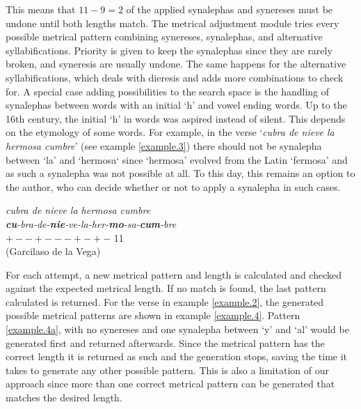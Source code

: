 \documentclass[a4paper,11pt,twocolumn,twoside]{article}
\begin{document}
This means that $11 - 9 = 2$ of the applied synalephas and synereses must be undone until both lengths match. The metrical adjustment module tries every possible metrical pattern combining synereses, synalephas, and alternative syllabifications. Priority is given to keep the synalephas since they are rarely broken, and syneresis are usually undone. The same happens for the alternative syllabifications, which deals with dieresis and adds more combinations to check for. A special case adding possibilities to the search space is the handling of synalephas between words with an initial `h' and vowel ending words.
Up to the 16th century, the initial `h' in words was aspired instead of silent. This depends on the etymology of some words. For example, in the verse `\textit{cubra de nieve la hermosa cumbre}' (see example \ref{example.3}) there should not be synalepha between `la' and `hermosa` since `hermosa' evolved from the Latin `fermosa' and as such a synalepha was not possible at all. To this day, this remains an option to the author, who can decide whether or not to apply a synalepha in such cases.

\begin{subexamples}\label{example.3}
\textit{cubra de nieve la hermosa cumbre}\\
\textit{\textbf{cu}-bra-de-\textbf{nie}-ve-la-her-\textbf{mo}-sa-\textbf{cum}-bre} \\
$+--+---+-+-$ 11 \\
(Garcilaso de la Vega) \\
\end{subexamples}

For each attempt, a new metrical pattern and length is calculated and checked against the expected metrical length. If no match is found, the last pattern calculated is returned. For the verse in example \ref{example.2}, the generated possible metrical patterns are shown in example \ref{example.4}. Pattern \ref{example.4a}, with no synereses and one synalepha between `y' and `al' would be generated first and returned afterwards. Since the metrical pattern has the correct length it is returned as such and the generation stops, saving the time it takes to generate any other possible pattern. This is also a limitation of our approach since more than one correct metrical pattern can be generated that matches the desired length.
\end{document}
